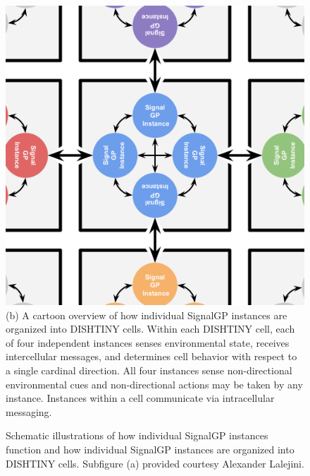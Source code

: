 \begin{figure}
\begin{center}
\begin{minipage}[t]{0.5\linewidth}
\includegraphics[width=0.8\linewidth]{img/dishtinygp-cartoon}\\
{(b)
A cartoon overview of how individual SignalGP instances are organized into DISHTINY cells.
Within each DISHTINY cell, each of four independent instances senses environmental state, receives intercellular messages, and determines cell behavior with respect to a single cardinal direction.
All four instances sense non-directional environmental cues and non-directional actions may be taken by any instance.
Instances within a cell communicate via intracellular messaging.
}
\end{minipage}

\caption{
Schematic illustrations of how individual SignalGP instances function and how individual SignalGP instances are organized into DISHTINY cells.
Subfigure (a) provided courtesy Alexander Lalejini.
}
\label{fig:signalgp-dishtinygp}
\end{center}
\end{figure}
